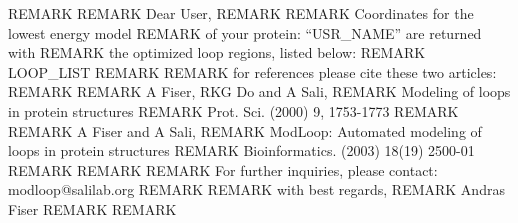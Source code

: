 REMARK 
REMARK  Dear User,
REMARK    
REMARK  Coordinates for the lowest energy model 
REMARK  of your protein: ``USR_NAME''  are returned with 
REMARK  the optimized loop regions, listed below: 
REMARK  LOOP_LIST
REMARK     
REMARK  for references please cite these two articles:
REMARK
REMARK     A Fiser, RKG Do and A Sali, 
REMARK     Modeling of loops in protein structures
REMARK     Prot. Sci. (2000) 9, 1753-1773
REMARK
REMARK     A Fiser and A Sali,
REMARK     ModLoop: Automated modeling of loops in protein structures
REMARK     Bioinformatics. (2003) 18(19) 2500-01
REMARK
REMARK
REMARK  For further inquiries, please contact: modloop@salilab.org
REMARK     
REMARK  with best regards,
REMARK  Andras Fiser
REMARK
REMARK
